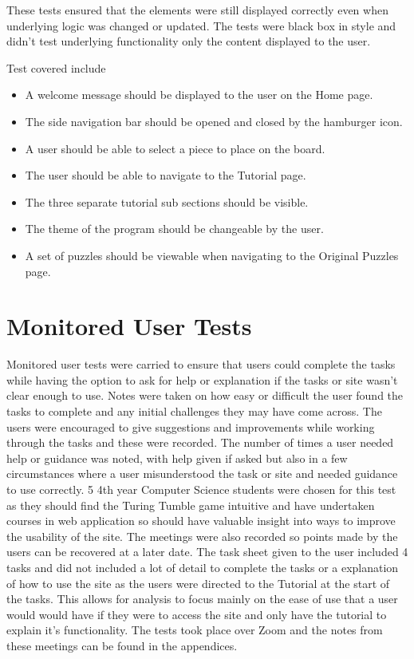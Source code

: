 \documentclass{l4proj}
\begin{document}
These tests ensured that the elements were still displayed correctly even when underlying logic was changed or updated. The tests were black box in style and didn't test underlying functionality only the content displayed to the user. 

Test covered include 
\begin{itemize}
    \item A welcome message should be displayed to the user on the Home page.
    \item The side navigation bar should be opened and closed by the hamburger icon.
    \item A user should be able to select a piece to place on the board.
    \item The user should be able to navigate to the Tutorial page.
    \item The three separate tutorial sub sections should be visible.
    \item The theme of the program should be changeable by the user.
    \item A set of puzzles should be viewable when navigating to the Original Puzzles page. 
\end{itemize}

\section{Monitored User Tests}
Monitored user tests were carried to ensure that users could complete the tasks while having the option to ask for help or explanation if the tasks or site wasn't clear enough to use. Notes were taken on how easy or difficult the user found the tasks to complete and any initial challenges they may have come across. The users were encouraged to give suggestions and improvements while working through the tasks and these were recorded. The number of times a user needed help or guidance was noted, with help given if asked but also in a few circumstances where a user misunderstood the task or site and needed guidance to use correctly. 5 4th year Computer Science students  were chosen for this test as they should find the Turing Tumble game intuitive and have undertaken courses in web application so should have valuable insight into ways to improve the usability of the site. The meetings were also recorded so points made by the users can be recovered at a later date. The task sheet given to the user included 4 tasks and did not included a lot of detail to complete the tasks or a explanation of how to use the site as the users were directed to the Tutorial at the start of the tasks. This allows for analysis to focus mainly on the ease of use that a user would would have if they were to access the site and only have the tutorial to explain it's functionality. The tests took place over Zoom and the notes from these meetings can be found in the appendices.
\end{document}
